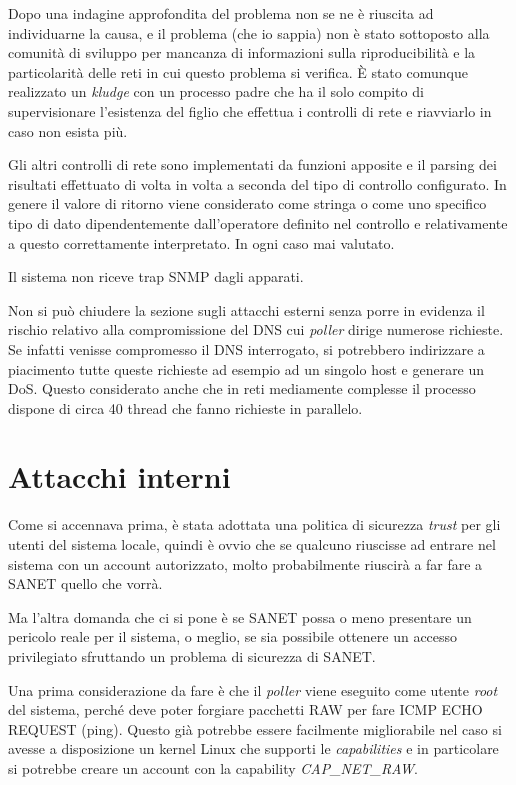 \documentclass[a4wide,10pt,italian]{manual}
\begin{document}
Dopo una indagine approfondita del problema non se ne è riuscita ad individuarne la causa, e il problema (che io sappia)
non è stato sottoposto alla comunità di sviluppo per mancanza di informazioni sulla riproducibilità e la particolarità delle
reti in cui questo problema si verifica. È stato comunque realizzato un \emph{kludge} con un processo padre che ha il solo compito
di supervisionare l'esistenza del figlio che effettua i controlli di rete e riavviarlo in caso non esista più.

Gli altri controlli di rete sono implementati da funzioni apposite e il parsing dei risultati effettuato di volta in volta
a seconda del tipo di controllo configurato. In genere il valore di ritorno viene considerato come stringa o come uno specifico
tipo di dato dipendentemente dall'operatore definito nel controllo e relativamente a questo correttamente interpretato.
In ogni caso mai valutato.

Il sistema non riceve trap SNMP dagli apparati.

Non si può chiudere la sezione sugli attacchi esterni senza porre in evidenza il rischio relativo alla compromissione del DNS
cui \emph{poller} dirige numerose richieste. Se infatti venisse compromesso il DNS interrogato, si potrebbero indirizzare a piacimento
tutte queste richieste ad esempio ad un singolo host e generare un DoS. Questo considerato anche che in reti mediamente
complesse il processo dispone di circa 40 thread che fanno richieste in parallelo.


\section{Attacchi interni}

Come si accennava prima, è stata adottata una politica di sicurezza \emph{trust} per gli utenti del sistema locale,
quindi è ovvio che se qualcuno riuscisse ad entrare nel sistema con un account autorizzato, molto probabilmente
riuscirà a far fare a SANET quello che vorrà.

Ma l'altra domanda che ci si pone è se SANET possa o meno presentare un pericolo reale per il sistema,
o meglio, se sia possibile ottenere un accesso privilegiato sfruttando un problema di sicurezza di SANET.

Una prima considerazione da fare è che il \emph{poller} viene eseguito come utente \emph{root} del sistema,
perché deve poter forgiare pacchetti RAW per fare ICMP ECHO REQUEST (ping). Questo già potrebbe essere
facilmente migliorabile nel caso si avesse a disposizione un kernel Linux che supporti le \emph{capabilities}
e in particolare si potrebbe creare un account con la capability \emph{CAP\_NET\_RAW}.
\end{document}
